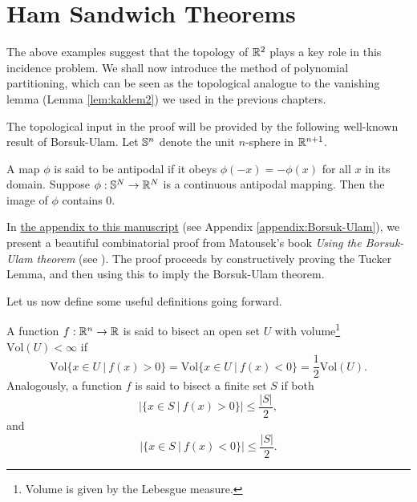\section{Ham Sandwich Theorems \label{sect:ham-sandwich-thms}}
The above examples suggest that the topology of $\mathbb R^2$ plays a key role in this incidence problem. We shall now introduce the method of polynomial partitioning,
which can be seen as the topological analogue to the vanishing lemma (Lemma \ref{lem:kaklem2}) we used in the previous chapters. 

The topological input in the proof will be provided by the following well-known result of Borsuk-Ulam.
Let $\mathbb S^n$ denote the unit $n$-sphere in $\mathbb R^{n+1}$. 
\begin{theorem}
    A map $\phi$ is said to be antipodal if it obeys $\phi (-x) = -\phi(x)$ for all $x$ in its domain. Suppose $\phi: \mathbb S^N \to \mathbb R^N$ is a continuous antipodal mapping. 
    Then the image of $\phi$ contains 0. \label{thm:Borsuk-Ulam}
\end{theorem}
In \hyperref[appendix:Borsuk-Ulam]{the appendix to this manuscript} (see Appendix \ref{appendix:Borsuk-Ulam}), we present a beautiful combinatorial proof from Matousek's book \textit{Using the Borsuk-Ulam theorem} (see \cite{matouvsek2003using}).
The proof proceeds by constructively proving the Tucker Lemma, and then using this to imply the Borsuk-Ulam theorem.

Let us now define some useful definitions going forward. 
\begin{definition}
A function $f :\mathbb R^n \to \mathbb R$ is said to bisect an open set $U$ with volume\footnote{Volume is given by the Lebesgue measure.} $\text{Vol}(U) < \infty$ if
\[
    \text{Vol}\{x \in U \ | \ f(x) > 0 \} = \text{Vol}\{x \in U \ | \ f(x) < 0 \} = \frac{1}{2} \text{Vol}(U).
\]
Analogously, a function $f$ is said to bisect a finite set $S$ if both
\[
  |\{x \in S \ | \ f(x) > 0\}| \leq \frac{|S|}{2},   
\]
and 
\[
  |\{x \in S \ | \ f(x) < 0\}| \leq \frac{|S|}{2}.
\]
\end{definition}

